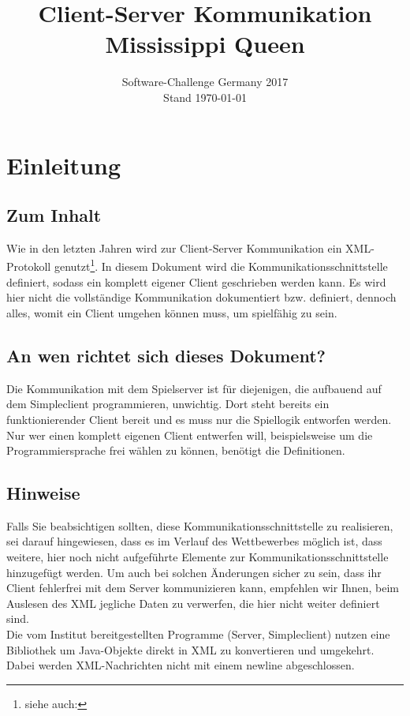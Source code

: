 \documentclass[12pt,a4paper, ngerman, oneside]{scrartcl}
\date{Software-Challenge Germany 2017\\Stand \today}
\title{Client-Server Kommunikation Mississippi Queen}
\begin{document}
\maketitle
\thispagestyle{empty}
\tableofcontents
\thispagestyle{empty}
\newpage
\setcounter{page}{1}
\section{Einleitung}
\subsection*{Zum Inhalt} Wie in den letzten Jahren wird zur Client-Server
Kommunikation ein XML-Protokoll genutzt\footnote{siehe auch:
}. In diesem
Dokument wird die Kommunikationsschnittstelle definiert, sodass ein komplett
eigener Client geschrieben werden kann. Es wird hier nicht die vollständige
Kommunikation dokumentiert bzw. definiert, dennoch alles, womit ein Client
umgehen können muss, um spielfähig zu sein.
\subsection*{An wen richtet sich dieses Dokument?} Die Kommunikation mit dem
Spielserver ist für diejenigen, die aufbauend auf dem Simpleclient
programmieren, unwichtig. Dort steht bereits ein funktionierender Client bereit
und es muss nur die Spiellogik entworfen werden. \\
Nur wer einen komplett eigenen Client entwerfen will, beispielsweise um die
Programmiersprache frei wählen zu können, benötigt die Definitionen.

\subsection*{Hinweise} Falls Sie beabsichtigen sollten, diese
Kommunikationsschnittstelle zu realisieren, sei darauf hingewiesen, dass es im
Verlauf des Wettbewerbes möglich ist, dass weitere, hier noch nicht aufgeführte
Elemente zur Kommunikationsschnittstelle hinzugefügt werden. Um auch bei
solchen Änderungen sicher zu sein, dass ihr Client fehlerfrei mit dem Server
kommunizieren kann, empfehlen wir Ihnen, beim Auslesen des XML jegliche Daten zu
verwerfen, die hier nicht weiter definiert sind. \bigskip \\
Die vom Institut bereitgestellten Programme (Server, Simpleclient) nutzen eine
Bibliothek um Java-Objekte direkt in XML zu konvertieren und umgekehrt. 
Dabei werden XML-Nachrichten nicht mit einem newline abgeschlossen.
\end{document}
